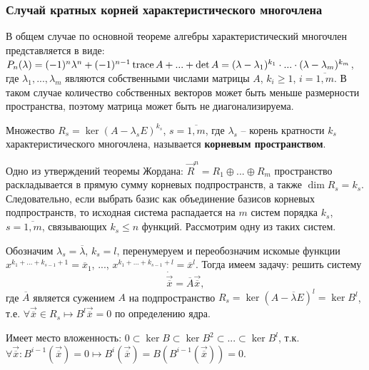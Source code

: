 \subsubsection*{Случай кратных корней характеристического многочлена}

В общем случае по основной теореме алгебры характеристический многочлен представляется в виде: 
$P_n (\lambda) = (-1)^n \lambda^n + (-1)^{n-1}\operatorname{trace} A + ... + \det A = (\lambda - \lambda_1)^{k_1} \cdot ... \cdot (\lambda - \lambda_m)^{k_m}$, 
где $\lambda_1, ..., \lambda_m$ являются собственными числами матрицы $A$, $k_i \geqslant 1$, $i = \overline{1, m}$. 
В таком случае количество собственных векторов может быть меньше размерности пространства, поэтому матрица может быть не диагонализируема.

\begin{definition}
    Множество $R_s = \ker (A - \lambda_s E)^{k_s}$, $s = \overline{1, m}$, где $\lambda_s$ -- корень кратности $k_s$ характеристического многочлена, называется \textbf{корневым пространством}.
\end{definition}

Одно из утверждений теоремы Жордана: $\overrightarrow{R}^n = R_1 \oplus ... \oplus R_m $ пространство раскладывается в прямую сумму корневых подпространств, а также $\dim R_s = k_s$.
Следовательно, если выбрать базис как объединение базисов корневых подпространств, то исходная система распадается на $m$ систем порядка $k_s$, $s = \overline{1, m}$, связывающих $k_s \leqslant n$ функций. Рассмотрим одну из таких систем.

Обозначим $\lambda_s = \overline{\lambda}$, $k_s = l$, перенумеруем и переобозначим искомые функции \\ $x^{k_1 + ... + k_{s-1} + 1} = \overline{x}_1$, ..., $x^{k_1 + ... + k_{s - 1} + l} = \overline{x}^l$.
Тогда имеем задачу: решить систему
\begin{equation}
    \dot{\overrightarrow{\overline{x}}} = \overline{A} \overrightarrow{\overline{x}},
\end{equation}
где $\overline{A}$ является сужением $A$ на подпространство $R_s = \ker (A - \overline{\lambda} E)^{l} = \ker B^l$, т.е. $\forall \overrightarrow{\overline{x}} \in R_s \mapsto B^l \overrightarrow{\overline{x}} = 0$ по определению ядра. 

Имеет место вложенность: $ 0 \subset \ker B \subset \ker B^2 \subset ... \subset \ker B^l$, 
т.к. $\forall \overrightarrow{\overline{x}}: B^{i-1}(\overrightarrow{\overline{x}}) = 0 \mapsto B^{i}(\overrightarrow{\overline{x}}) = B(B^{i-1}(\overrightarrow{\overline{x}})) = 0$.

